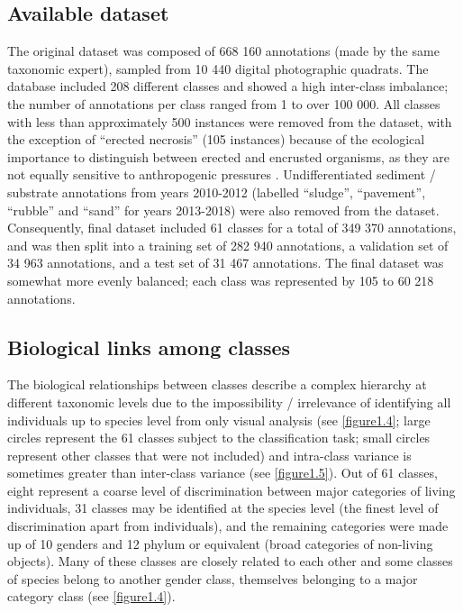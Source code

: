 \subsection{Available dataset}\label{chapitre1_3.2}
The original dataset was composed of 668 160 annotations (made by the same taxonomic expert), sampled from 10 440 digital photographic quadrats. The database included 208 different classes and showed a high inter-class imbalance; the number of annotations per class ranged from 1 to over 100 000. All classes with less than approximately 500 instances were removed from the dataset, with the exception of “erected necrosis” (105 instances) because of the ecological importance to distinguish between erected and encrusted organisms, as they are not equally sensitive to anthropogenic pressures \citep{sartoretto_integrated_2017}. Undifferentiated sediment / substrate annotations from years 2010-2012 (labelled “sludge”, “pavement”, “rubble” and “sand” for years 2013-2018) were also removed from the dataset. Consequently, final dataset included 61 classes for a total of 349 370 annotations, and was then split into a training set of 282 940 annotations, a validation set of 34 963 annotations, and a test set of 31 467 annotations. The final dataset was somewhat more evenly balanced; each class was represented by 105 to 60 218 annotations.

\subsection{Biological links among classes }\label{chapitre1_3.3}
The biological relationships between classes describe a complex hierarchy at different taxonomic levels due to the impossibility / irrelevance of identifying all individuals up to species level from only visual analysis (see \autoref{figure1.4}; large circles represent the 61 classes subject to the classification task; small circles represent other classes that were not included) and intra-class variance is sometimes greater than inter-class variance (see \autoref{figure1.5}). Out of 61 classes, eight represent a coarse level of discrimination between major categories of living individuals, 31 classes may be identified at the species level (the finest level of discrimination apart from individuals), and the remaining categories were made up of 10 genders and 12 phylum or equivalent (broad categories of non-living objects). Many of these classes are closely related to each other and some classes of species belong to another gender class, themselves belonging to a major category class (see \autoref{figure1.4}).

